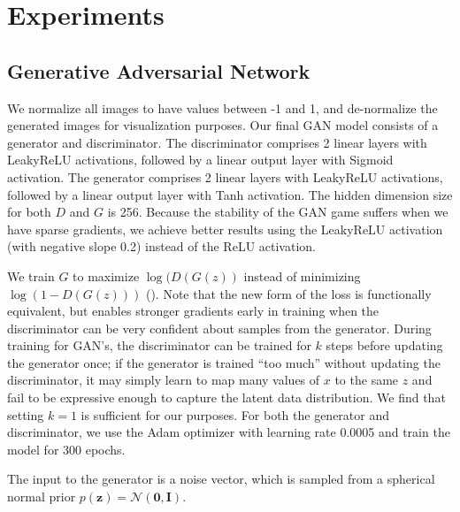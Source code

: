 \documentclass[11pt]{article}
\begin{document}
\section{Experiments}


\subsection{Generative Adversarial Network} 
We normalize all images to have values between -1 and 1, and de-normalize the generated images for visualization purposes. Our final GAN model consists of a generator and discriminator. The discriminator comprises 2 linear layers with LeakyReLU activations, followed by a linear output layer with Sigmoid activation. The generator comprises 2 linear layers with LeakyReLU activations, followed by a linear output layer with Tanh activation. The hidden dimension size for both $D$ and $G$ is 256. Because the stability of the GAN game suffers when we have sparse gradients, we achieve better results using the LeakyReLU activation (with negative slope 0.2) instead of the ReLU activation.

We train $G$ to maximize $\log(D(G(z))$ instead of minimizing $\log(1-D(G(z)))$ (\cite{gan}). Note that the new form of the loss is functionally equivalent, but enables stronger gradients early in training when the discriminator can be very confident about samples from the generator. During training for GAN's, the discriminator can be trained for $k$ steps before updating the generator once; if the generator is trained ``too much'' without updating the discriminator, it may simply learn to map many values of $x$ to the same $z$ and fail to be expressive enough to capture the latent data distribution. We find that setting $k=1$ is sufficient for our purposes. For both the generator and discriminator, we use the Adam optimizer with learning rate 0.0005 and train the model for 300 epochs.

The input to the generator is a noise vector, which is sampled from a spherical normal prior $p(\mathbf{z}) = \mathcal{N}(\mathbf{0}, \mathbf{I})$.
\end{document}
